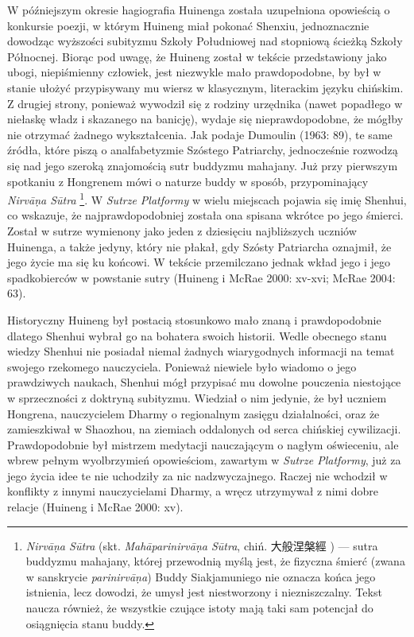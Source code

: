 W późniejszym okresie hagiografia Huinenga została uzupełniona opowieścią o konkursie poezji, w którym Huineng miał pokonać Shenxiu, jednoznacznie dowodząc wyższości subityzmu Szkoły Południowej nad stopniową ścieżką Szkoły Północnej.
Biorąc pod uwagę, że Huineng został w tekście przedstawiony jako ubogi, niepiśmienny człowiek, jest niezwykle mało prawdopodobne, by był w stanie ułożyć przypisywany mu wiersz w klasycznym, literackim języku chińskim.
Z drugiej strony, ponieważ wywodził się z rodziny urzędnika (nawet popadłego w niełaskę władz i skazanego na banicję), wydaje się nieprawdopodobne, że mógłby nie otrzymać żadnego wykształcenia.
Jak podaje Dumoulin (1963: 89), te same źródła, które piszą o analfabetyzmie Szóstego Patriarchy, jednocześnie rozwodzą się nad jego szeroką znajomością sutr buddyzmu mahajany.
Już przy pierwszym spotkaniu z Hongrenem mówi o naturze buddy w sposób, przypominający \textit{Nirvā\d{n}a Sūtra}%
\footnote{\textit{Nirvā\d{n}a Sūtra} (skt. \textit{Mahāparinirvā\d{n}a Sūtra}, chiń. 大般涅槃經 ) --- sutra buddyzmu mahajany, której przewodnią myślą jest, że fizyczna śmierć (zwana w sanskrycie \textit{parinirvā\d{n}a}) Buddy Siakjamuniego nie oznacza końca jego istnienia, lecz dowodzi, że umysł %
jest niestworzony i niezniszczalny. Tekst naucza również, że wszystkie czujące istoty mają taki sam potencjał do osiągnięcia stanu buddy.}.
W \textit{Sutrze Platformy} w wielu miejscach pojawia się imię Shenhui, co wskazuje, że najprawdopodobniej została ona spisana wkrótce po jego śmierci.
Został w sutrze wymienony jako jeden z dziesięciu najbliższych uczniów Huinenga, a także jedyny, który nie płakał, gdy Szósty Patriarcha oznajmił, że jego życie ma się ku końcowi.
W tekście przemilczano jednak wkład jego i jego spadkobierców w powstanie sutry
(Huineng i McRae 2000: xv-xvi; McRae 2004: 63).

Historyczny Huineng był postacią stosunkowo mało znaną i prawdopodobnie dlatego Shenhui wybrał go na bohatera swoich historii.
Wedle obecnego stanu wiedzy Shenhui nie posiadał niemal żadnych wiarygodnych informacji na temat swojego rzekomego nauczyciela.
Ponieważ niewiele było wiadomo o jego prawdziwych naukach, Shenhui mógł przypisać mu dowolne pouczenia niestojące w sprzeczności z doktryną subityzmu.
Wiedział o nim jedynie, że był uczniem Hongrena, nauczycielem Dharmy o regionalnym zasięgu działalności, oraz że zamieszkiwał w Shaozhou, na ziemiach oddalonych od serca chińskiej cywilizacji.
Prawdopodobnie był mistrzem medytacji nauczającym o nagłym oświeceniu, ale wbrew pełnym wyolbrzymień opowieściom, zawartym w \textit{Sutrze Platformy}, już za jego życia idee te nie uchodziły za nic nadzwyczajnego.
Raczej nie wchodził w konflikty z innymi nauczycielami Dharmy, a wręcz utrzymywał z nimi dobre relacje
(Huineng i McRae 2000: xv).

